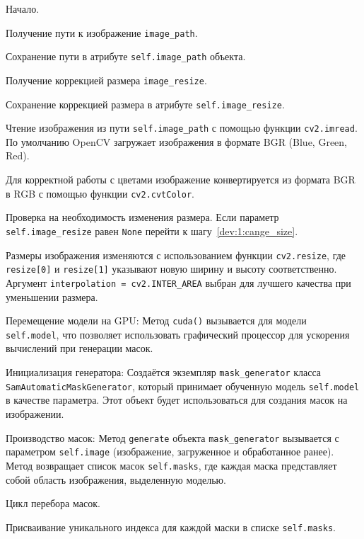 \begin{enumerate_step}
    \item Начало.
    \item Получение пути к изображение \lstinline{image_path}.
    \item Сохранение пути в атрибуте \lstinline{self.image_path} объекта.
    \item Получение коррекцией размера \lstinline{image_resize}.
    \item Сохранение коррекцией размера в атрибуте \lstinline{self.image_resize}.
    \item Чтение изображения из пути \lstinline{self.image_path} с помощью функции \lstinline{cv2.imread}. По умолчанию OpenCV загружает изображения в формате BGR (Blue, Green, Red).
    \item Для корректной работы с цветами изображение конвертируется из формата BGR в RGB с помощью функции \lstinline{cv2.cvtColor}.
    \item Проверка на необходимость изменения размера. Если параметр \lstinline{self.image_resize} равен \lstinline{None} перейти к шагу~\ref{dev:1:cange_size}.
    \item Размеры изображения изменяются с использованием функции \lstinline{cv2.resize}, где \lstinline{resize[0]} и \lstinline{resize[1]} указывают новую ширину и высоту соответственно. Аргумент \lstinline{interpolation = cv2.INTER_AREA} выбран для лучшего качества при уменьшении размера.
    \item \label{dev:1:cange_size} Перемещение модели на GPU: Метод \lstinline{cuda()} вызывается для модели \lstinline{self.model}, что позволяет использовать графический процессор для ускорения вычислений при генерации масок.
    \item Инициализация генератора: Создаётся экземпляр \lstinline{mask_generator} класса \lstinline{SamAutomaticMaskGenerator}, который принимает обученную модель \lstinline{self.model} в качестве параметра. Этот объект будет использоваться для создания масок на изображении.
    \item Производство масок: Метод \lstinline{generate} объекта \lstinline{mask_generator} вызывается с параметром \lstinline{self.image} (изображение, загруженное и обработанное ранее). Метод возвращает список масок \lstinline{self.masks}, где каждая маска представляет собой область изображения, выделенную моделью.
    \item Цикл перебора масок.
    \item Присваивание уникального индекса для каждой маски в списке \lstinline{self.masks}.

\end{enumerate_step}
